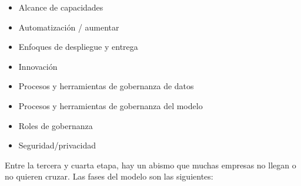 \begin{center}
    \hspace{1.65cm}
    \begin{minipage}{0.45\textwidth}
        \begin{tcolorbox}[colback=green!25, colframe=green!75, width=5.5cm, height=5.5cm, title=Madurez Analítica, fonttitle=\color{black}\bfseries, valign=center, left=1mm, right=1mm, arc=2mm, boxrule=0.5mm]
            \begin{itemize}
                \item Alcance de capacidades
                \item Automatización / aumentar
                \item Enfoques de despliegue y entrega
                \item Innovación
            \end{itemize}
        \end{tcolorbox}
    \end{minipage} \hspace{-1.25cm}
    \begin{minipage}{0.45\textwidth}
        \begin{tcolorbox}[colback=cyan!25, colframe=cyan!75, width=5.5cm, height=5.5cm, title=Madurez de Gobernanza, fonttitle=\color{black}\bfseries, valign=center, left=1mm, right=1mm, arc=2mm, boxrule=0.5mm]
            \begin{itemize}
                \item Procesos y herramientas de gobernanza de datos
                \item Procesos y herramientas de gobernanza del modelo
                \item Roles de gobernanza
                \item Seguridad/privacidad
            \end{itemize}
        \end{tcolorbox}
    \end{minipage}
\end{center}

Entre la tercera y cuarta etapa, hay un abismo que muchas empresas no llegan o no quieren cruzar. Las fases del modelo son las siguientes: 


